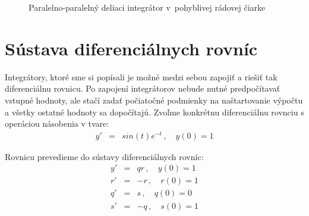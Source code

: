 \begin{figure}[h]
\centering
{}
\caption{Paralelno-paralelný deliaci integrátor v~pohyblivej rádovej čiarke}
\label{ppdi_fp}
\end{figure}
\bigskip

\newpage
\section{Sústava diferenciálnych rovníc}
Integrátory, ktoré sme si popísali je možné medzi sebou zapojiť a riešiť tak diferenciálnu rovnicu. Po zapojení integrátorov nebude nutné predpočítavať vstupné hodnoty, ale stačí zadať počiatočné podmienky na naštartovanie výpočtu a všetky ostatné hodnoty sa dopočítajú.
Zvoľme konkrétnu diferenciálnu rovnciu s operáciou násobenia v tvare:
\begin{eqnarray}
y' & = & sin(t) e^{-t} \, , \quad y(0) = 1 \label{dif_sint_et}
\end{eqnarray}
\bigskip

Rovnicu prevedieme do sústavy diferenciálnych rovníc:
\begin{eqnarray}
y' & = & qr \, , \quad y(0) = 1 \nonumber \\
r' & = & -r \, , \quad r(0) = 1 \nonumber \\
q' & = & s \, , \quad q(0) = 0 \nonumber \\
s' & = & -q \, , \quad s(0) = 1 \nonumber \\
\end{eqnarray}

